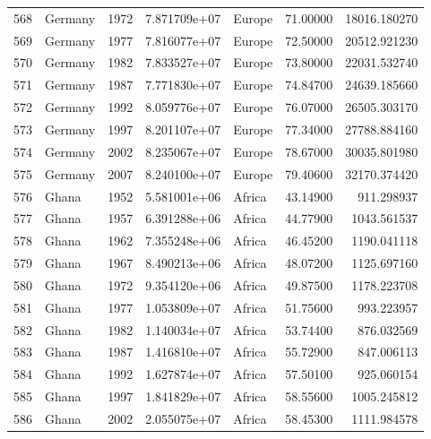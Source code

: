 \documentclass[
  letterpaper,
  DIV=11,
  numbers=noendperiod]{scrreprt}
\begin{document}
\begin{tabular}{llrrlrr}
568  &                   Germany &  1972 &  7.871709e+07 &    Europe &  71.00000 &   18016.180270 \\
569  &                   Germany &  1977 &  7.816077e+07 &    Europe &  72.50000 &   20512.921230 \\
570  &                   Germany &  1982 &  7.833527e+07 &    Europe &  73.80000 &   22031.532740 \\
571  &                   Germany &  1987 &  7.771830e+07 &    Europe &  74.84700 &   24639.185660 \\
572  &                   Germany &  1992 &  8.059776e+07 &    Europe &  76.07000 &   26505.303170 \\
573  &                   Germany &  1997 &  8.201107e+07 &    Europe &  77.34000 &   27788.884160 \\
574  &                   Germany &  2002 &  8.235067e+07 &    Europe &  78.67000 &   30035.801980 \\
575  &                   Germany &  2007 &  8.240100e+07 &    Europe &  79.40600 &   32170.374420 \\
576  &                     Ghana &  1952 &  5.581001e+06 &    Africa &  43.14900 &     911.298937 \\
577  &                     Ghana &  1957 &  6.391288e+06 &    Africa &  44.77900 &    1043.561537 \\
578  &                     Ghana &  1962 &  7.355248e+06 &    Africa &  46.45200 &    1190.041118 \\
579  &                     Ghana &  1967 &  8.490213e+06 &    Africa &  48.07200 &    1125.697160 \\
580  &                     Ghana &  1972 &  9.354120e+06 &    Africa &  49.87500 &    1178.223708 \\
581  &                     Ghana &  1977 &  1.053809e+07 &    Africa &  51.75600 &     993.223957 \\
582  &                     Ghana &  1982 &  1.140034e+07 &    Africa &  53.74400 &     876.032569 \\
583  &                     Ghana &  1987 &  1.416810e+07 &    Africa &  55.72900 &     847.006113 \\
584  &                     Ghana &  1992 &  1.627874e+07 &    Africa &  57.50100 &     925.060154 \\
585  &                     Ghana &  1997 &  1.841829e+07 &    Africa &  58.55600 &    1005.245812 \\
586  &                     Ghana &  2002 &  2.055075e+07 &    Africa &  58.45300 &    1111.984578 \\

\end{tabular}
\end{document}
